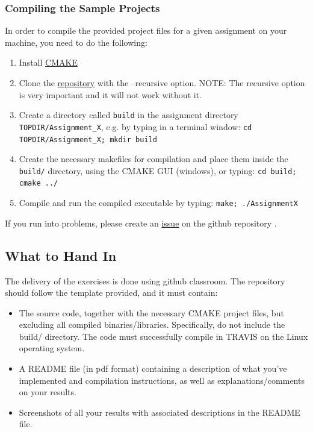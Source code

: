 \documentclass[11pt]{report}
\begin{document}
\subsubsection*{Compiling the Sample Projects}
In order to compile the provided project files for a given assignment on your machine, you need to do the following:
  \begin{enumerate}
\item{Install \href{http://www.cmake.org/download/}{CMAKE}}
\item{Clone the \href{https://github.com/danielepanozzo/cg}{repository} with the --recursive option. NOTE: The recursive option is very important and it will not work without it. }
\item{Create a directory called \texttt{build} in the assignment directory \texttt{TOPDIR/Assignment\_X}, e.g. by typing in a terminal window:
\texttt{cd TOPDIR/Assignment\_X; mkdir build}
}
\item{
Create the necessary makefiles for compilation and place them inside the \texttt{build/} directory, using the CMAKE GUI (windows), or typing:
\texttt{cd build; cmake ../}
}
\item{Compile and run the compiled executable by typing:
\texttt{make; ./AssignmentX}
}
\end{enumerate}

If you run into problems, please create an \href{https://github.com/danielepanozzo/cg/issues}{issue} on the github repository .

\subsection*{What to Hand In}
The delivery of the exercises is done using github classroom. The repository should follow the template provided, and it must contain:
\begin{itemize}
\item{The source code, together with the necessary CMAKE project files, but excluding all compiled binaries/libraries. Specifically, do not include the build/ directory. The code must successfully compile in TRAVIS on the Linux operating system.}
\item{A README file (in pdf format) containing a description of what you've implemented and compilation
instructions, as well as explanations/comments on your results.}
\item{Screenshots of all your results with associated descriptions in the README file.}
\end{itemize}
\end{document}

